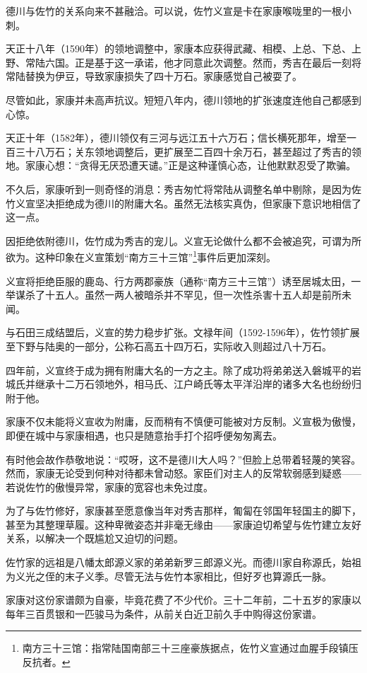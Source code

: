 \documentclass[
]{book}
\begin{document}
德川与佐竹的关系向来不甚融洽。可以说，佐竹义宣是卡在家康喉咙里的一根小刺。

天正十八年（1590年）的领地调整中，家康本应获得武藏、相模、上总、下总、上野、常陆六国。正是基于这一承诺，他才同意此次调整。然而，秀吉在最后一刻将常陆替换为伊豆，导致家康损失了四十万石。家康感觉自己被耍了。

尽管如此，家康并未高声抗议。短短八年内，德川领地的扩张速度连他自己都感到心惊。

天正十年（1582年），德川领仅有三河与远江五十六万石；信长横死那年，增至一百三十八万石；关东领地调整后，更扩展至二百四十余万石，甚至超过了秀吉的领地。家康心想：``贪得无厌恐遭天谴。''正是这种谨慎心态，让他默默忍受了欺骗。

不久后，家康听到一则奇怪的消息：秀吉匆忙将常陆从调整名单中剔除，是因为佐竹义宣坚决拒绝成为德川的附庸大名。虽然无法核实真伪，但家康下意识地相信了这一点。

因拒绝依附德川，佐竹成为秀吉的宠儿。义宣无论做什么都不会被追究，可谓为所欲为。这种印象在义宣策划``南方三十三馆''\footnote{南方三十三馆：指常陆国南部三十三座豪族据点，佐竹义宣通过血腥手段镇压反抗者。}事件后更加深刻。

义宣将拒绝臣服的鹿岛、行方两郡豪族（通称``南方三十三馆''）诱至居城太田，一举谋杀了十五人。虽然一两人被暗杀并不罕见，但一次性杀害十五人却是前所未闻。

与石田三成结盟后，义宣的势力稳步扩张。文禄年间（1592-1596年），佐竹领扩展至下野与陆奥的一部分，公称石高五十四万石，实际收入则超过八十万石。

四年前，义宣终于成为拥有附庸大名的一方之主。除了成功将弟弟送入磐城平的岩城氏并继承十二万石领地外，相马氏、江户崎氏等太平洋沿岸的诸多大名也纷纷归附于他。

家康不仅未能将义宣收为附庸，反而稍有不慎便可能被对方反制。义宣极为傲慢，即便在城中与家康相遇，也只是随意抬手打个招呼便匆匆离去。

有时他会故作恭敬地说：``哎呀，这不是德川大人吗？''但脸上总带着轻蔑的笑容。然而，家康无论受到何种对待都未曾动怒。家臣们对主人的反常软弱感到疑惑------若说佐竹的傲慢异常，家康的宽容也未免过度。

为了与佐竹修好，家康甚至愿意像当年对秀吉那样，匍匐在邻国年轻国主的脚下，甚至为其整理草履。这种卑微姿态并非毫无缘由------家康迫切希望与佐竹建立友好关系，以解决一个既尴尬又迫切的问题。

佐竹家的远祖是八幡太郎源义家的弟弟新罗三郎源义光。而德川家自称源氏，始祖为义光之侄的末子义季。尽管无法与佐竹本家相比，但好歹也算源氏一脉。

家康对这份家谱颇为自豪，毕竟花费了不少代价。三十二年前，二十五岁的家康以每年三百贯银和一匹骏马为条件，从前关白近卫前久手中购得这份家谱。
\end{document}
